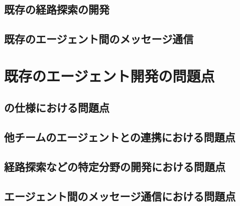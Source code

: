 \subsection{既存の経路探索の開発}
\subsection{既存のエージェント間のメッセージ通信}


\section{既存のエージェント開発の問題点}
\subsection{\RCRS の仕様における問題点}
\subsection{他チームのエージェントとの連携における問題点}
\subsection{経路探索などの特定分野の開発における問題点}
\subsection{エージェント間のメッセージ通信における問題点}
